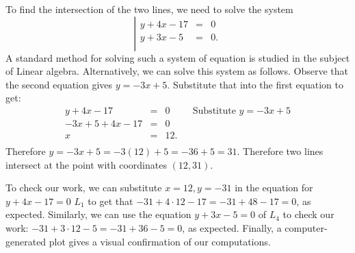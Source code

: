 {To find the intersection of the two lines, we need to solve the system 
\[
\left| \begin{array}{rcl}
y+4 x-17 &=&0 \\
y+3x-5&=&0.\\
\end{array}\right.
\]
A standard method for solving such a system of equation is studied in the subject of Linear algebra. Alternatively, we can solve this system as follows. Observe that the second equation gives $y=-3x+5$. Substitute that into the first equation to get:
\[
\begin{array}{rcll|l}
y+4 x-17 &=&0&&\text{Substitute } y=-3x+5 \\
-3x+5 +4x-17&=&0\\
x&=&12.\\
\end{array}
\]
Therefore $y=-3x+5=-3(12)+5=-36+5=31$. Therefore two lines intersect at the point with coordinates $(12, 31)$. 

To check our work, we can substitute $x=12, y=-31$ in the equation for $y+4x-17=0$ $L_1$ to get that $ -31+4\cdot 12-17=-31+48-17=0$, as expected. Similarly, we can use the equation $y+3x-5=0$ of $L_4$ to check our work: $-31+3\cdot 12-5=-31+36-5=0$, as expected. Finally, a computer-generated plot gives a visual confirmation of our computations.
}
